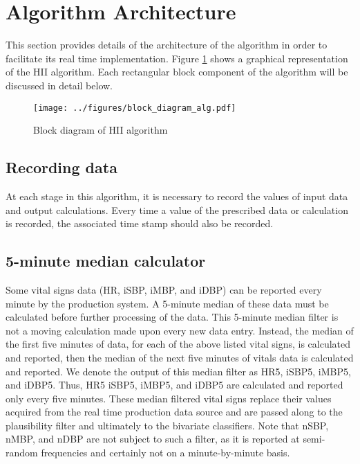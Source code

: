 \documentclass[
   technote
]{phildoc}
\newcommand{\hii}{HII}
\newcommand{\mx}[1]{{\color{green}{MX: #1}}}
\begin{document}
\section{Algorithm Architecture}
\label{sec:alg_archit}
This section provides details of the architecture of the algorithm in order 
to facilitate its real time implementation. Figure \ref{fig:block_diagram} shows a graphical representation of the \hii{} algorithm. Each rectangular block component of the algorithm will be discussed in detail below. 

\begin{figure}[h!]
	\centering
	\texttt{[image: ../figures/block\_diagram\_alg.pdf]}
	\caption{Block diagram of \hii{} algorithm} 
	\label{fig:block_diagram}      
\end{figure}



\subsection{Recording data}
At each stage in this algorithm, it is necessary to record the values of input data and output calculations. Every time a value of the prescribed data or calculation is recorded, the associated time stamp should also be recorded.

\subsection{5-minute median calculator}
Some vital signs data (HR, iSBP, iMBP, and iDBP) can be reported every minute by the production system.  A 5-minute median of these data must be calculated before further processing of the data.  This 5-minute median filter is not a moving calculation made upon every new data entry. Instead, the median of the first five minutes of data, for each of the above listed vital signs, is calculated and reported, then the median of the next five minutes of vitals data is calculated and reported.  We denote the output of this median filter as HR5, iSBP5, iMBP5, and iDBP5.  Thus, HR5 iSBP5, iMBP5, and iDBP5 are calculated and reported only every five minutes.  These median filtered vital signs replace their values acquired from the real time production data source and are passed along to the plausibility filter and ultimately to the bivariate classifiers. Note that nSBP, nMBP, and nDBP are not subject to such a filter, as it is reported at semi-random frequencies and certainly not on a minute-by-minute basis.
\end{document}
